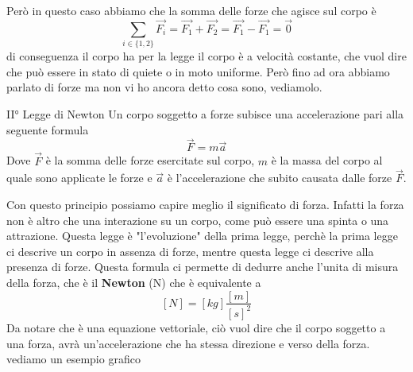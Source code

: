 \documentclass{rapport}
\begin{document}
Però in questo caso abbiamo che la somma delle forze che agisce sul corpo è 
\[
\sum_{i \in \{1,2\}} \vec{F_i} = \vec{F_1} + \vec{F_2} = \vec{F_1} - \vec{F_1} = \vec{0}
\]
di conseguenza il corpo ha per la legge il corpo è a velocità costante, che vuol dire che può essere in stato di quiete o in moto uniforme. Però fino ad ora abbiamo parlato di forze ma non vi ho ancora detto cosa sono, vediamolo.

\begin{legge}{II° Legge di Newton}{}
  Un corpo soggetto a forze subisce una accelerazione pari alla seguente formula
  \[
  \vec{F} = m\vec{a}
  \]
  Dove $\vec{F}$ è la somma delle forze esercitate sul corpo, $m$ è la massa del corpo al quale sono applicate le forze e $\vec{a}$ è l'accelerazione che subito causata dalle forze $\vec{F}$.
\end{legge}

Con questo principio possiamo capire meglio il significato di forza. Infatti la forza non è altro che una interazione su un corpo, come può essere una spinta o una attrazione. Questa legge è "l'evoluzione" della prima legge, perchè la prima legge ci descrive un corpo in assenza di forze, mentre questa legge ci descrive alla presenza di forze. Questa formula ci permette di dedurre anche l'unita di misura della forza, che è il \textbf{Newton} (N) che è equivalente a
\[
[N] = [kg] \dfrac{[m]}{[s]^2}
\]
Da notare che è una equazione vettoriale, ciò vuol dire che il corpo soggetto a una forza, avrà un'accelerazione che ha stessa direzione e verso della forza. vediamo un esempio grafico

\begin{center}
\end{center}
\end{document}
